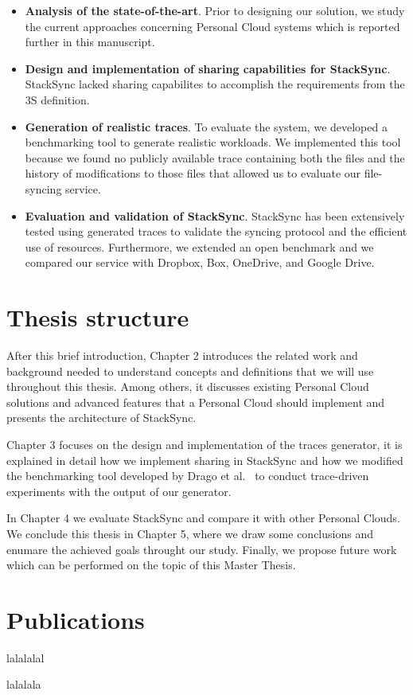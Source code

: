 \begin{itemize}
	\item \textbf{Analysis of the state-of-the-art}. Prior to designing our solution, we study the current approaches concerning Personal Cloud systems which is reported further in this manuscript.
	\item \textbf{Design and implementation of sharing capabilities for StackSync}. StackSync lacked sharing capabilites to accomplish the requirements from the 3S definition. 
	\item \textbf{Generation of realistic traces}. To evaluate the system, we developed a benchmarking tool to generate
realistic workloads. We implemented this tool because we found no publicly available trace containing both 
the files and the history of modifications to those files that allowed us to evaluate our file-syncing service.
	\item \textbf{Evaluation and validation of StackSync}. StackSync has been extensively tested using generated traces to validate the syncing protocol and the efficient use of resources. Furthermore, we extended an open benchmark \cite{drago2013benchmarking} and we compared our service with Dropbox, Box, OneDrive, and Google Drive.
\end{itemize}

\section{Thesis structure}
After this brief introduction, Chapter 2 introduces the related work and background needed to understand concepts
and definitions that we will use throughout this thesis. Among others, it discusses existing Personal Cloud solutions and advanced features that a Personal Cloud should implement and presents the architecture of StackSync.

Chapter 3 focuses on the design and implementation of the traces generator, it is explained in detail how we implement sharing in StackSync and how we modified the benchmarking tool developed by Drago et al.~\cite{drago2013benchmarking} to
conduct trace-driven experiments with the output of our generator.

In Chapter 4 we evaluate StackSync and compare it with other Personal Clouds. We conclude this thesis in Chapter 5, where we draw some conclusions and enumare the achieved goals throught our study. Finally, we propose future work which can be performed on the topic of this Master Thesis.

\section{Publications}

lalalalal

lalalala